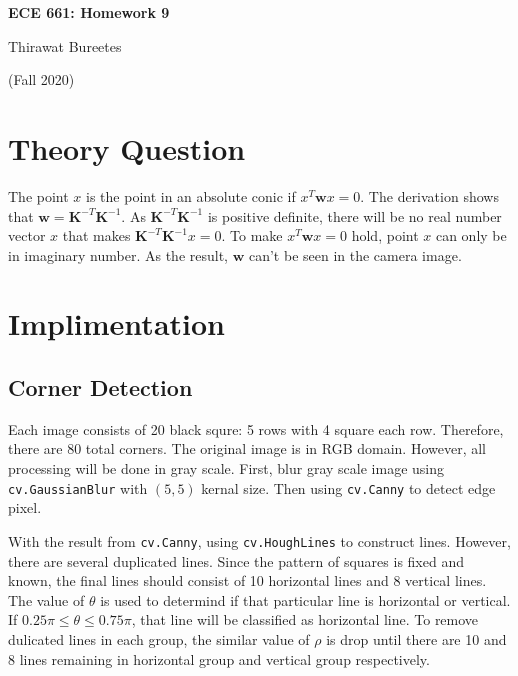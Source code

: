 \documentclass[11pt]{article}
\begin{document}
\begin{center}
\Large{\textbf{ECE 661: Homework 9}}

Thirawat Bureetes

(Fall 2020)
\end{center}
	
 

\section*{Theory Question}

The point $x$ is the point in an absolute conic if $x^T \mathbf{w} x = 0$. The derivation shows that $\mathbf{w} = \mathbf{K}^{-T} \mathbf{K}^{-1}$. As $\mathbf{K}^{-T} \mathbf{K}^{-1}$ is positive definite, there will be no real number vector $x$ that makes $\mathbf{K}^{-T} \mathbf{K}^{-1} x = 0$. To make $x^T \mathbf{w} x = 0$ hold, point $x$ can only be in imaginary number. As the result, $\mathbf{w}$ can't be seen in the camera image.


\section*{Implimentation}


\subsection*{Corner Detection}

Each image consists of 20 black squre: 5 rows with 4 square each row. Therefore, there are 80 total corners. The original image is in RGB domain. However, all processing will be done in gray scale. First, blur gray scale image using  \lstinline{cv.GaussianBlur} with $(5,5)$ kernal size. Then using   \lstinline{cv.Canny} to detect edge pixel.

With the result from \lstinline{cv.Canny}, using \lstinline{cv.HoughLines} to construct lines. However, there are several duplicated lines. Since the pattern of squares is fixed and known, the final lines should consist of 10 horizontal lines and 8 vertical lines. The value of $\theta$ is used to determind if that particular line is horizontal or vertical. If $0.25 \pi \leq \theta \leq 0.75 \pi$, that line will be classified as horizontal line. To remove dulicated lines in each group, the similar value of $\rho$ is drop until there are 10 and 8 lines remaining in horizontal group and vertical group respectively.
\end{document}
